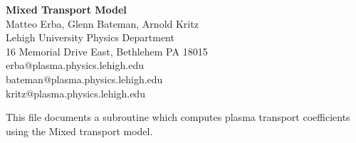 %
 
\headheight 0pt \headsep 0pt  \topmargin 0pt  \oddsidemargin 0pt
\textheight 9.0in \textwidth 6.5in

\begin{center}
\Large {\bf Mixed Transport Model} \\
\vspace{1pc} \normalsize
Matteo Erba, Glenn Bateman, Arnold Kritz \\
 Lehigh University Physics Department \\
16 Memorial Drive East, Bethlehem PA 18015 \\
erba@plasma.physics.lehigh.edu \\
bateman@plasma.physics.lehigh.edu \\
kritz@plasma.physics.lehigh.edu
\end{center}

This file documents a subroutine which computes
plasma transport coefficients using the Mixed transport model.  

